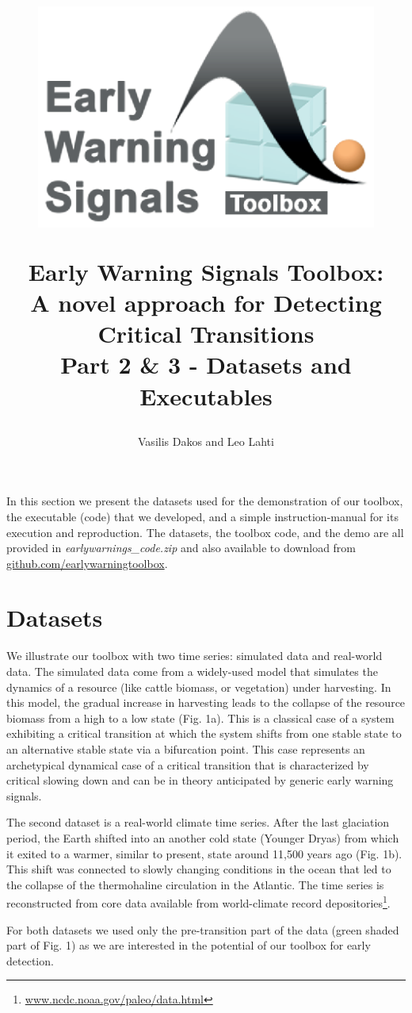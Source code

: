 \documentclass[12pt,a4paper,final]{article}
\author{Vasilis Dakos and Leo Lahti}
\title{
\begin{figure}[h]
\includegraphics[scale=0.55]{logoEWS.eps}
\end{figure}
Early Warning Signals Toolbox:\\ 
A novel approach for Detecting Critical Transitions\\
Part 2 \& 3 - Datasets and Executables
}
\begin{document}
\maketitle

\begin{doublespacing}

In this section we present the datasets used for the demonstration of our toolbox, the executable (code) that we developed, and a simple instruction-manual for its execution and reproduction. The datasets, the toolbox code, and the demo are all provided in \textit{earlywarnings\_code.zip} and also available to download from \url{github.com/earlywarningtoolbox}.

\section{Datasets}
We illustrate our toolbox with two time series: simulated data and real-world data. The simulated data come from a widely-used model that simulates the dynamics of a resource (like cattle biomass,  or vegetation) under harvesting. In this model, the gradual increase in harvesting leads to the collapse of the resource biomass from a high to a low state (Fig. 1a). This is a classical case of a system exhibiting a critical transition at which the system shifts from one stable state to an alternative stable state via a bifurcation point. This case represents an archetypical dynamical case of a critical transition that is characterized by critical slowing down and can be in theory anticipated by generic early warning signals.

The second dataset is a real-world climate time series. After the last glaciation period, the Earth shifted into an another cold state (Younger Dryas) from which it exited to a warmer, similar to present, state around 11,500 years ago (Fig. 1b). This shift was connected to slowly changing conditions in the ocean that led to the collapse of the thermohaline circulation in the Atlantic. The time series is reconstructed from core data available from world-climate record depositories\footnote{\url{www.ncdc.noaa.gov/paleo/data.html}}.

For both datasets we used only the pre-transition part of the data (green shaded part of Fig. 1) as we are interested in the potential of our toolbox for early detection.


\end{doublespacing}
\end{document}
